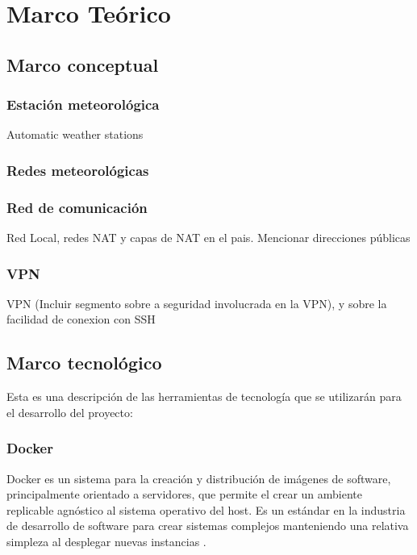 \section{Marco Teórico}

\subsection{Marco conceptual}

\subsubsection{Estación meteorológica}

Automatic weather stations

\subsubsection{Redes meteorológicas}

\subsubsection{Red de comunicación}

Red Local, redes NAT y capas de NAT en el pais. Mencionar direcciones públicas

\subsubsection{VPN}

VPN (Incluir segmento sobre a seguridad involucrada en la VPN), y sobre la facilidad de conexion con SSH


\subsection{Marco tecnológico}

Esta es una descripción de las herramientas de tecnología que se utilizarán para el desarrollo del proyecto:

\subsubsection{Docker}

Docker es un sistema para la creación y distribución de imágenes de software, principalmente orientado a servidores, que permite el crear un ambiente replicable agnóstico al sistema operativo del host. Es un estándar en la industria de desarrollo de software para crear sistemas complejos manteniendo una relativa simpleza al desplegar nuevas instancias \cite{Rad2017DockerAnalysis}.

